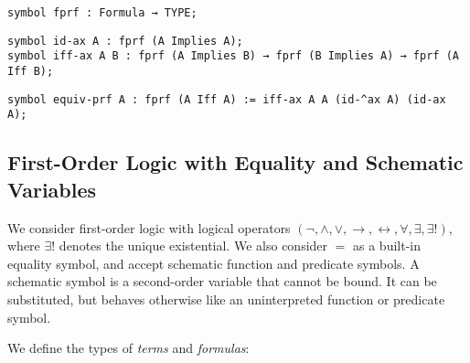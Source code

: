 \documentclass{article}
\begin{document}
	\begin{lstlisting}[language=Dialekto, firstnumber=last]
symbol fprf : Formula → TYPE;
	\end{lstlisting}
	
	\begin{lstlisting}[language=Dialekto, firstnumber=last]
symbol id-ax A : fprf (A Implies A);
symbol iff-ax A B : fprf (A Implies B) → fprf (B Implies A) → fprf (A Iff B);
	\end{lstlisting}
	
	
	\begin{lstlisting}[language=Dialekto, firstnumber=last]
symbol equiv-prf A : fprf (A Iff A) := iff-ax A A (id-^ax A) (id-ax A);
	\end{lstlisting}

\newpage	
	
	\subsection{First-Order Logic with Equality and Schematic Variables}\label{SSect:FOL}
	We consider first-order logic with logical operators $(\neg, \land, \lor, \rightarrow, \leftrightarrow, \forall, \exists, \exists !)$, where $\exists !$ denotes the unique existential. We also consider $=$ as a built-in equality symbol, and accept schematic function and predicate symbols. A schematic symbol is a second-order variable that cannot be bound. It can be substituted, but behaves otherwise like an uninterpreted function or predicate symbol.
	
	We define the types of \textit{terms} and \textit{formulas}:
\end{document}
